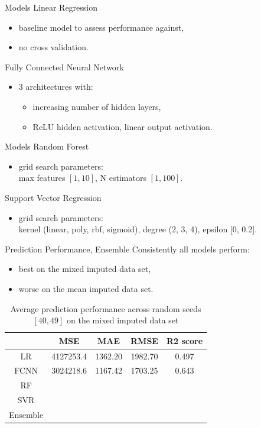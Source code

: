 \documentclass[xcolor=table]{beamer} %
\begin{document}
\begin{frame}{Models}
  \vspace{-0.5cm}
  Linear Regression
  \begin{itemize}
      \item baseline model to assess performance against,
      \item no cross validation.
  \end{itemize}
  Fully Connected Neural Network
  \begin{itemize}
      \item 3 architectures with:
        \begin{itemize}
            \item increasing number of hidden layers,
            \item ReLU hidden activation, linear output activation.
        \end{itemize}
  \end{itemize}
\end{frame}

\begin{frame}{Models}
  \vspace{-0.5cm}
  Random Forest
  \begin{itemize}
      \item grid search parameters:\\
      max features $[1, 10]$, N estimators $[1, 100]$.
  \end{itemize}
  Support Vector Regression
  \begin{itemize}
      \item grid search parameters:\\
      kernel (linear, poly, rbf, sigmoid), degree (2, 3, 4), epsilon [0, 0.2].
  \end{itemize}
\end{frame}

\begin{frame}{Prediction Performance, Ensemble}
\vspace{-0.9cm}
 Consistently all models perform:
  \begin{itemize}
      \item best on the mixed imputed data set,
      \item worse on the mean imputed data set.
  \end{itemize}
  \begin{table}[ht!]
    \hspace{-0.7cm}
    \begin{tabular}{|c|c|c|c|c|}
        \hline
        & MSE & MAE & RMSE & R2 score\\
        \hline
        LR & 4127253.4 & 1362.20 & 1982.70 & 0.497 \\
        FCNN & 3024218.6 & 1167.42 & 1703.25 & 0.643 \\
        RF &  &  &  &  \\
        SVR &  &  &  &  \\
        Ensemble &  &  &  &  \\
        \hline
    \end{tabular}
    \caption{Average prediction performance across random seeds $[40, 49]$ on the mixed imputed data set}
    \label{tab:pred_perf}
\end{table}
\end{frame}
\end{document}
